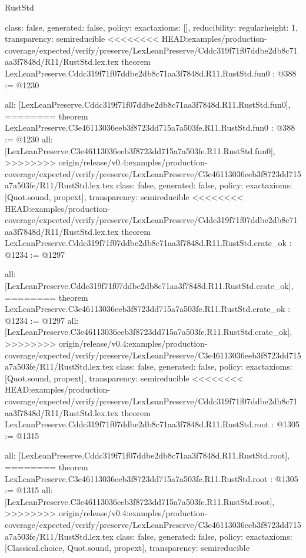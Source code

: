 \begin{lexlean}{RustStd}
\begin{coremodule}
{\begin{coremodule}
{{{  class: false,
  generated: false,
  policy: exact{axioms: []},
  reducibility: regular{height: 1},
  transparency: semireducible
}
<<<<<<<< HEAD:examples/production-coverage/expected/verify/preserve/LexLeanPreserve/Cddc319f71f07ddbe2db8c71aa3f7848d/R11/RustStd.lex.tex
theorem LexLeanPreserve.Cddc319f71f07ddbe2db8c71aa3f7848d.R11.RustStd.fun0 : @388 := @1230 {
  all: [LexLeanPreserve.Cddc319f71f07ddbe2db8c71aa3f7848d.R11.RustStd.fun0],
========
theorem LexLeanPreserve.C3e46113036eeb3f8723dd715a7a503fe.R11.RustStd.fun0 : @388 := @1230 {
  all: [LexLeanPreserve.C3e46113036eeb3f8723dd715a7a503fe.R11.RustStd.fun0],
>>>>>>>> origin/release/v0.4:examples/production-coverage/expected/verify/preserve/LexLeanPreserve/C3e46113036eeb3f8723dd715a7a503fe/R11/RustStd.lex.tex
  class: false,
  generated: false,
  policy: exact{axioms: [Quot.sound, propext]},
  transparency: semireducible
}
<<<<<<<< HEAD:examples/production-coverage/expected/verify/preserve/LexLeanPreserve/Cddc319f71f07ddbe2db8c71aa3f7848d/R11/RustStd.lex.tex
theorem LexLeanPreserve.Cddc319f71f07ddbe2db8c71aa3f7848d.R11.RustStd.crate_ok : @1234 := @1297 {
  all: [LexLeanPreserve.Cddc319f71f07ddbe2db8c71aa3f7848d.R11.RustStd.crate_ok],
========
theorem LexLeanPreserve.C3e46113036eeb3f8723dd715a7a503fe.R11.RustStd.crate_ok : @1234 := @1297 {
  all: [LexLeanPreserve.C3e46113036eeb3f8723dd715a7a503fe.R11.RustStd.crate_ok],
>>>>>>>> origin/release/v0.4:examples/production-coverage/expected/verify/preserve/LexLeanPreserve/C3e46113036eeb3f8723dd715a7a503fe/R11/RustStd.lex.tex
  class: false,
  generated: false,
  policy: exact{axioms: [Quot.sound, propext]},
  transparency: semireducible
}
<<<<<<<< HEAD:examples/production-coverage/expected/verify/preserve/LexLeanPreserve/Cddc319f71f07ddbe2db8c71aa3f7848d/R11/RustStd.lex.tex
theorem LexLeanPreserve.Cddc319f71f07ddbe2db8c71aa3f7848d.R11.RustStd.root : @1305 := @1315 {
  all: [LexLeanPreserve.Cddc319f71f07ddbe2db8c71aa3f7848d.R11.RustStd.root],
========
theorem LexLeanPreserve.C3e46113036eeb3f8723dd715a7a503fe.R11.RustStd.root : @1305 := @1315 {
  all: [LexLeanPreserve.C3e46113036eeb3f8723dd715a7a503fe.R11.RustStd.root],
>>>>>>>> origin/release/v0.4:examples/production-coverage/expected/verify/preserve/LexLeanPreserve/C3e46113036eeb3f8723dd715a7a503fe/R11/RustStd.lex.tex
  class: false,
  generated: false,
  policy: exact{axioms: [Classical.choice, Quot.sound, propext]},
  transparency: semireducible
}

}}}}}
\end{coremodule}}
\end{coremodule}
\end{lexlean}
